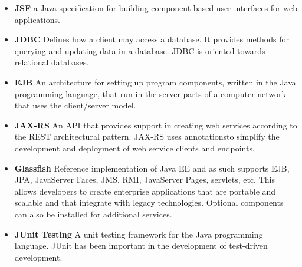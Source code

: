 \begin{itemize}
		\item \textbf{JSF}  a Java specification for building component-based user interfaces for web applications.
			
			\item \textbf{JDBC} Defines how a client may access a database. It provides methods for querying and updating data in a database. JDBC is oriented towards relational databases.
			
			\item \textbf{EJB} An architecture for setting up program components, written in the Java programming language, that run in the server parts of a computer network that uses the client/server model.
			
			\item \textbf{JAX-RS} An API that provides support in creating web services according to the REST architectural pattern. JAX-RS uses annotationsto simplify the development and deployment of web service clients and endpoints.
			
			\item \textbf{Glassfish}  Reference implementation of Java EE and as such supports EJB, JPA, JavaServer Faces, JMS, RMI, JavaServer Pages, servlets, etc. This allows developers to create enterprise applications that are portable and scalable and that integrate with legacy technologies. Optional components can also be installed for additional services.
			
			\item \textbf{JUnit Testing} A unit testing framework for the Java programming language. JUnit has been important in the development of test-driven development.
		
\end{itemize}